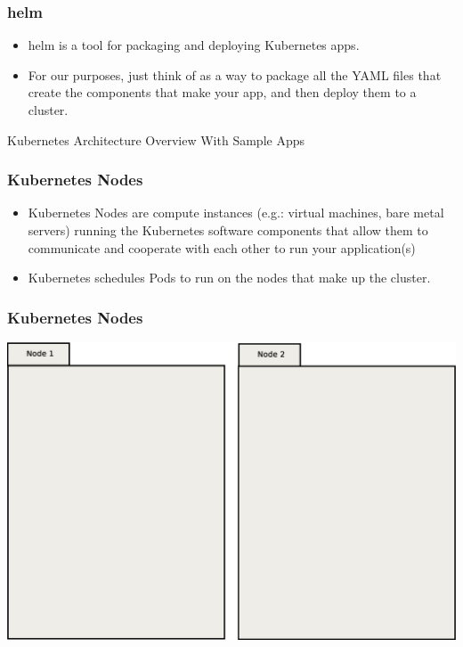 \documentclass{beamer}
\begin{document}
\begin{frame}
\frametitle{helm\footnotemark}
\begin{itemize}
    \item helm is a tool for packaging and deploying Kubernetes apps.
    \item For our purposes, just think of as a way to package all the YAML files that create the components that make your app, and then deploy them to a cluster.
\end{itemize}
\end{frame}

\begin{frame}
    \begin{center}
        \Huge Kubernetes Architecture Overview With Sample Apps
    \end{center}
\end{frame}

\begin{frame}
\frametitle{Kubernetes Nodes}
\begin{itemize}
\item Kubernetes Nodes are compute instances (e.g.: virtual machines, bare metal servers) running the Kubernetes software components that allow them to communicate and cooperate with each other to run your application(s)
\item Kubernetes schedules Pods to run on the nodes that make up the cluster.
\end{itemize}
\end{frame}

\begin{frame}
    \frametitle{Kubernetes Nodes}
    \includegraphics[width=\textwidth,height=\textheight,keepaspectratio]{graphics/00-nodes.eps}
\end{frame}
\end{document}
